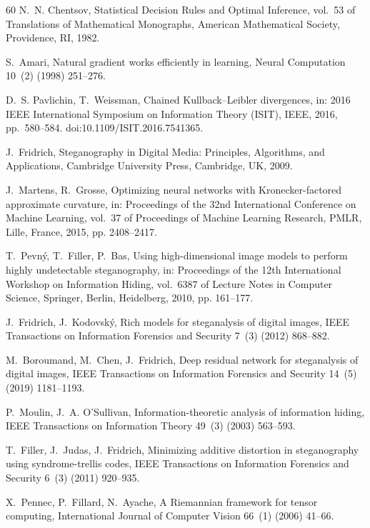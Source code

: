 \documentclass[a4paper,fleqn]{cas-dc}
\begin{document}
\begin{thebibliography}{60}
N.~N. Chentsov, Statistical Decision Rules and Optimal Inference, vol.~53 of Translations of Mathematical Monographs, American Mathematical Society, Providence, RI, 1982.

S.~Amari, Natural gradient works efficiently in learning, Neural Computation 10~(2) (1998) 251--276.

D.~S. Pavlichin, T.~Weissman, Chained Kullback--Leibler divergences,
in: 2016 IEEE International Symposium on Information Theory (ISIT),
IEEE, 2016, pp.~580--584. doi:10.1109/ISIT.2016.7541365.

J.~Fridrich, Steganography in Digital Media: Principles, Algorithms, and Applications, Cambridge University Press, Cambridge, UK, 2009.

J.~Martens, R.~Grosse, Optimizing neural networks with Kronecker-factored approximate curvature, in: Proceedings of the 32nd International Conference on Machine Learning, vol.~37 of Proceedings of Machine Learning Research, PMLR, Lille, France, 2015, pp. 2408--2417.

T.~Pevn\'y, T.~Filler, P.~Bas, Using high-dimensional image models to perform highly undetectable steganography, in: Proceedings of the 12th International Workshop on Information Hiding, vol.~6387 of Lecture Notes in Computer Science, Springer, Berlin, Heidelberg, 2010, pp. 161--177.

J.~Fridrich, J.~Kodovsk\'y, Rich models for steganalysis of digital images, IEEE Transactions on Information Forensics and Security 7~(3) (2012) 868--882.

M.~Boroumand, M.~Chen, J.~Fridrich, Deep residual network for steganalysis of digital images, IEEE Transactions on Information Forensics and Security 14~(5) (2019) 1181--1193.

P.~Moulin, J.~A. O'Sullivan, Information-theoretic analysis of information hiding, IEEE Transactions on Information Theory 49~(3) (2003) 563--593.

T.~Filler, J.~Judas, J.~Fridrich, Minimizing additive distortion in steganography using syndrome-trellis codes, IEEE Transactions on Information Forensics and Security 6~(3) (2011) 920--935.

X.~Pennec, P.~Fillard, N.~Ayache, A Riemannian framework for tensor computing, International Journal of Computer Vision 66~(1) (2006) 41--66.


\end{thebibliography}
\end{document}
